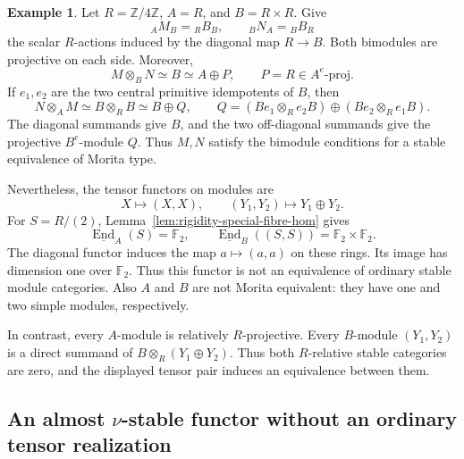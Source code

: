 \documentclass[12pt,a4paper,english,reqno]{amsart}
\numberwithin{equation}{section}
\theoremstyle{plain}
\theoremstyle{definition}
\newtheorem{example}[theorem]{Example}
\begin{document}
\begin{example}
\label{ex:rigidity-raw-semt-product}
Let $R=\mathbb Z/4\mathbb Z$, $A=R$, and $B=R\times R$.  Give
\[
 {}_AM_B={}_RB_B,\qquad {}_BN_A={}_BB_R
\]
the scalar $R$-actions induced by the diagonal map $R\to B$.
Both bimodules are projective on each side.  Moreover,
\[
 M\otimes_BN\simeq B\simeq A\oplus P,
 \qquad P=R\in A^e\text{-}\mathrm{proj}.
\]
If $e_1,e_2$ are the two central primitive idempotents of $B$, then
\[
 N\otimes_AM\simeq B\otimes_RB\simeq B\oplus Q,
 \qquad
 Q=(Be_1\otimes_Re_2B)\oplus(Be_2\otimes_Re_1B).
\]
The diagonal summands give $B$, and the two off-diagonal summands
give the projective $B^e$-module $Q$.  Thus $M,N$ satisfy the bimodule conditions for a stable equivalence
of Morita type.

Nevertheless, the tensor functors on modules are
\[
 X\longmapsto(X,X),\qquad (Y_1,Y_2)\longmapsto Y_1\oplus Y_2.
\]
For $S=R/(2)$, Lemma~\ref{lem:rigidity-special-fibre-hom} gives
\[
 \underline{\operatorname{End}}_A(S)=\mathbb F_2,
 \qquad
 \underline{\operatorname{End}}_B((S,S))
       =\mathbb F_2\times\mathbb F_2.
\]
The diagonal functor induces the map $a\mapsto(a,a)$
on these rings. Its image has dimension one over $\mathbb F_2$.  Thus this functor is not
an equivalence of ordinary stable module categories.  Also $A$
and $B$ are not Morita equivalent: they have one and two simple
modules, respectively.

In contrast, every $A$-module is relatively $R$-projective.  Every $B$-module
$(Y_1,Y_2)$ is a direct summand of
$B\otimes_R(Y_1\oplus Y_2)$.  Thus both $R$-relative stable
categories are zero, and the displayed tensor pair induces an
equivalence between them.
\end{example}

\subsection{An almost \texorpdfstring{$\nu$}{nu}-stable functor without an ordinary tensor realization}
\end{document}
